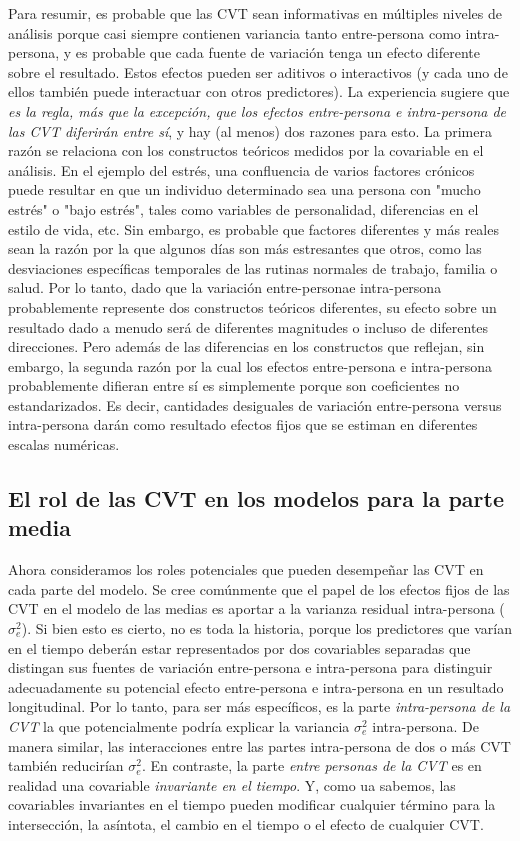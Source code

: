 \documentclass[spanish]{article}
\numberwithin{figure}{subsection}
\numberwithin{equation}{subsection}
\numberwithin{table}{subsection}
\begin{document}
Para resumir, es probable que las CVT sean informativas en múltiples niveles de análisis porque casi siempre
contienen variancia tanto entre-persona como intra-persona, y es probable que cada fuente de variación tenga
un efecto diferente sobre el resultado. Estos efectos pueden ser aditivos o interactivos (y cada uno de ellos
también puede interactuar con otros predictores). La experiencia sugiere que \textit{es la regla, más que la
excepción, que los efectos entre-persona e intra-persona de las CVT diferirán entre sí}, y hay (al menos) dos
razones para esto. La primera razón se relaciona con los constructos teóricos medidos por la covariable en
el análisis. En el ejemplo del estrés, una confluencia de varios factores crónicos puede resultar en que un
individuo determinado sea una persona con "mucho estrés" o "bajo estrés", tales como variables de personalidad,
diferencias en el estilo de vida, etc. Sin embargo, es probable que factores diferentes y más reales sean la
razón por la que algunos días son más estresantes que otros, como las desviaciones específicas temporales de
las rutinas normales de trabajo, familia o salud. Por lo tanto, dado que la variación entre-personae intra-persona
probablemente represente dos constructos teóricos diferentes, su efecto sobre un resultado dado a menudo será
de diferentes magnitudes o incluso de diferentes direcciones. Pero además de las diferencias en los constructos
que reflejan, sin embargo, la segunda razón por la cual los efectos entre-persona e intra-persona probablemente
difieran entre sí es simplemente porque son coeficientes no estandarizados. Es decir, cantidades desiguales de
variación entre-persona versus intra-persona darán como resultado efectos fijos que se estiman en diferentes
escalas numéricas.

\subsection{El rol de las CVT en los modelos para la parte media}

Ahora consideramos los roles potenciales que pueden desempeñar las CVT en cada parte del modelo. Se cree comúnmente que
el papel de los efectos fijos de las CVT en el modelo de las medias es aportar a la varianza residual intra-persona
($\sigma_e^2$). Si bien esto es cierto, no es toda la historia, porque los predictores que varían en el tiempo deberán
estar representados por dos covariables separadas que distingan sus fuentes de variación entre-persona e intra-persona
para distinguir adecuadamente su potencial efecto entre-persona e intra-persona en un resultado longitudinal. Por lo tanto,
para ser más específicos, es la parte \textit{intra-persona de la CVT} la que potencialmente
podría explicar la variancia $\sigma_e^2$ intra-persona. De manera similar, las interacciones entre las partes intra-persona
de dos o más CVT también reducirían $\sigma_e^2$. En contraste, la parte \textit{entre personas de la CVT} es en realidad
una covariable \textit{invariante en el tiempo}. Y, como ua sabemos, las covariables invariantes en el tiempo
pueden modificar cualquier término para la intersección, la asíntota, el cambio en el tiempo o el efecto de cualquier
CVT.
\end{document}
